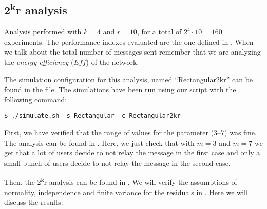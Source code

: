 \subsection{2\texorpdfstring{\textsuperscript{k}}{k}r
analysis}\label{subsec:rect2kr}

Analysis performed with \(k\!=\!4\) and \(r\!=\!10\), for a total of \(2^4 \cdot
10 \!=\!160\) experiments. The performance indexes evaluated are the one defined
in . When we talk about the total number of messages sent
remember that we are analyzing the \emph{energy efficiency} (\(\mathit{Eff}\))
of the network.

The simulation configuration for this analysis, named ``Rectangular2kr'' can be
found in the  file. The simulations have been run using
our  script with the following command:
\begin{verbatim}
$ ./simulate.sh -s Rectangular -c Rectangular2kr
\end{verbatim}

First, we have verified that the range of values for the 
parameter (3--7) was fine. The analysis can be found in .
Here, we just check that with \(m\!=\!3\) and \(m\!=\!7\) we get that a lot of
users decide to not relay the message in the first case and only a small bunch
of users decide to not relay the message in the second case.

Then, the 2\textsuperscript{k}r analysis can be found in . We
will verify the assumptions of normality, independence and finite variance for
the residuals in . Here we will discuss the
results.





